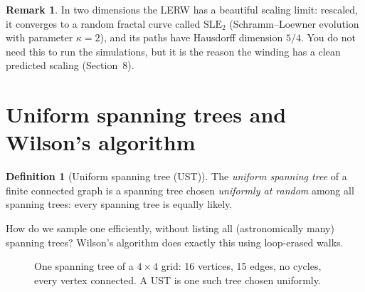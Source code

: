 \documentclass[11pt]{article}
\theoremstyle{definition}
\newtheorem{definition}{Definition}[section]
\newtheorem{remark}{Remark}[section]
\theoremstyle{plain}
\begin{document}
\begin{remark}
In two dimensions the LERW has a beautiful scaling limit: rescaled, it converges
to a random fractal curve called $\mathrm{SLE}_2$ (Schramm--Loewner evolution
with parameter $\kappa=2$), and its paths have Hausdorff dimension $5/4$. You do
not need this to run the simulations, but it is the reason the winding has a
clean predicted scaling (Section~8).
\end{remark}

\section{Uniform spanning trees and Wilson's algorithm}

\begin{definition}[Uniform spanning tree (UST)]
The \emph{uniform spanning tree} of a finite connected graph is a spanning tree
chosen \emph{uniformly at random} among all spanning trees: every spanning tree
is equally likely.
\end{definition}

How do we sample one efficiently, without listing all (astronomically many)
spanning trees? Wilson's algorithm does exactly this using loop-erased walks.

\begin{figure}[h]
\centering
{}
\caption{One spanning tree of a $4\times4$ grid: 16 vertices, 15 edges, no
cycles, every vertex connected. A UST is one such tree chosen uniformly.}
\label{fig:tree}
\end{figure}
\end{document}
